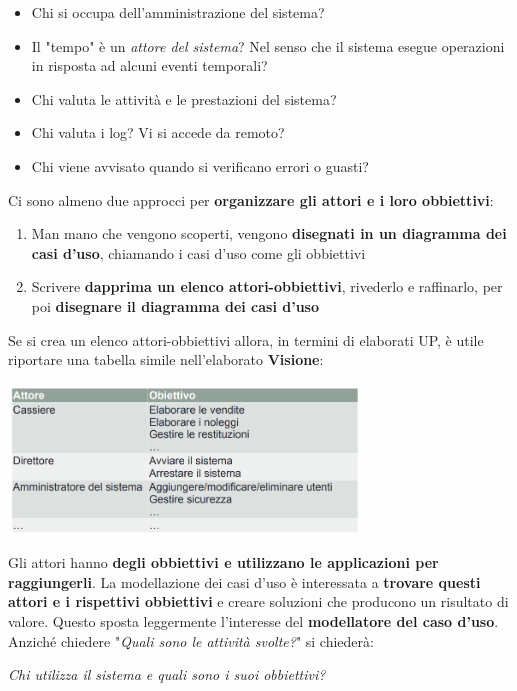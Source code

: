 \documentclass[12pt]{article}
\begin{document}
\begin{enumerate}
\begin{itemize}
\begin{itemize}
            \item Chi si occupa dell'amministrazione del sistema?
            \item Il "tempo" è un \textit{attore del sistema}? Nel senso che il sistema esegue operazioni in risposta ad alcuni eventi temporali?
            \item Chi valuta le attività e le prestazioni del sistema?
            \item Chi valuta i log? Vi si accede da remoto?
            \item Chi viene avvisato quando si verificano errori o guasti?
        \end{itemize}
        Ci sono almeno due approcci per \textbf{organizzare gli attori e i loro obbiettivi}:
        \begin{enumerate}
            \item Man mano che vengono scoperti, vengono \textbf{disegnati in un diagramma dei casi d'uso}, chiamando i casi d'uso come gli obbiettivi
            \item Scrivere \textbf{dapprima un elenco attori-obbiettivi}, rivederlo e raffinarlo, per poi \textbf{disegnare il diagramma dei casi d'uso}
        \end{enumerate}
        Se si crea un elenco attori-obbiettivi allora, in termini di elaborati UP, è utile riportare una tabella simile nell'elaborato \textbf{Visione}:
        \begin{center}
            \includegraphics[width = 0.70\textwidth]{Images/36.png}
        \end{center}
        Gli attori hanno \textbf{degli obbiettivi e utilizzano le applicazioni per raggiungerli}.
        La modellazione dei casi d'uso è interessata a \textbf{trovare questi attori e i rispettivi obbiettivi} e creare soluzioni che producono un risultato di valore.
        Questo sposta leggermente l'interesse del \textbf{modellatore del caso d'uso}. Anziché chiedere "\textit{Quali sono le attività svolte?}" si chiederà:
        \begin{center}
            \textit{Chi utilizza il sistema e quali sono i suoi obbiettivi?}

\end{center}
\end{itemize}
\end{enumerate}
\end{document}
